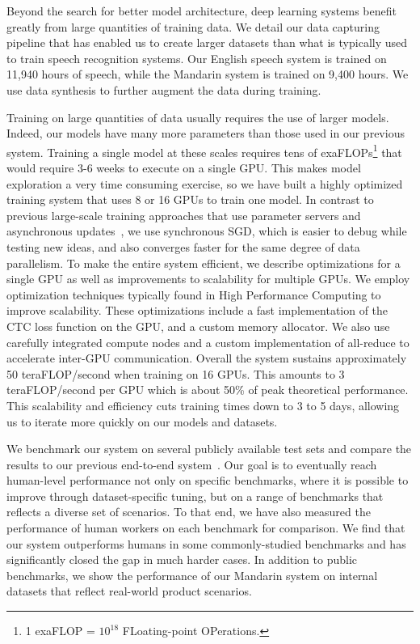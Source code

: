 \documentclass{article}
\begin{document}
Beyond the search for better model architecture, deep learning systems benefit greatly from large quantities of training data.  We detail our data capturing pipeline that has enabled us to create larger datasets than what is typically used to train speech recognition systems.  Our English speech system is trained on 11,940 hours of speech, while the Mandarin system is trained on 9,400 hours.  We use data synthesis to further augment the data during training.

Training on large quantities of data usually requires the use of larger models. Indeed, our models have many more parameters than those used in our previous system. Training a single model at these scales requires tens of exaFLOPs\footnote{1 exaFLOP = $10^{18}$ FLoating-point OPerations.} that would require 3-6 weeks to execute on a single GPU. This makes model exploration a very time consuming exercise, so we have built a highly optimized training system that uses 8 or 16 GPUs to train one model. In contrast to previous large-scale training approaches that use parameter servers and asynchronous updates~\cite{dean2012largescale, chilimbi2014adam},
we use synchronous SGD, which is easier to debug while testing new ideas, and also converges faster for the same degree of data parallelism. To make the entire system efficient, we describe optimizations for a single GPU as well as improvements to scalability for multiple GPUs. We employ optimization techniques typically found in High Performance Computing to improve scalability. These optimizations include a fast implementation of the CTC loss function on the GPU, and a custom memory allocator. We also use carefully integrated compute nodes and a custom implementation of all-reduce to accelerate inter-GPU communication. Overall the system sustains approximately 50 teraFLOP/second when training on 16 GPUs. This amounts to 3 teraFLOP/second per GPU which is about 50\% of peak theoretical performance. This scalability and efficiency cuts training times down to 3 to 5 days, allowing us to iterate more quickly on our models and datasets.

We benchmark our system on several publicly available test sets and compare the results to our previous end-to-end system~\cite{hannun2014deepspeech}.  Our goal is to eventually reach human-level performance not only on specific benchmarks, where it is possible to improve through dataset-specific tuning, but on a range of benchmarks that reflects a diverse set of scenarios. To that end, we have also measured the performance of human workers on each benchmark for comparison.  We find that our system outperforms humans in some commonly-studied benchmarks and has significantly closed the gap in much harder cases.  In addition to public benchmarks, we show the performance of our Mandarin system on internal datasets that reflect real-world product scenarios.
\end{document}
